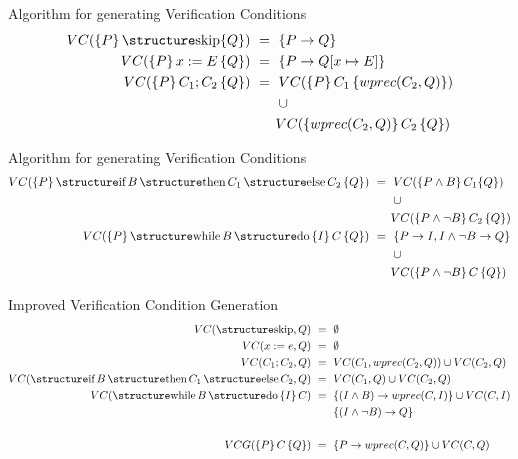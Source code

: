\documentclass[aspectratio=169]{beamer}
\begin{document}
\begin{slide}{Algorithm for generating Verification Conditions}
 \begin{align*}
 VC(\{P\}\,\kw{skip}\{Q\}) & ~=~ \{P \to Q\} \\
 VC(\{P\}\,x := E\,\{Q\})  & ~=~ \{P \to Q[x \mapsto E]\} \\
 VC(\{P\}\,C_1;C_2\,\{Q\}) & ~=~ VC(\{P\}\,C_1\,\{wprec(C_2,Q)\}) \\ &\:\:\:\:\:\:\:\:\:\cup \\& \:\:\:\:\:\:\:\:VC(\{wprec(C_2,Q)\}\,C_2\,\{Q\})  
 \end{align*}

\end{slide}

\begin{slide}{Algorithm for generating Verification Conditions}
 \begin{align*}
 VC(\{P\}\,\kw{if}\,B\,\kw{then}\,C_1\,\kw{else}\,C_2\,\{Q\}) & ~=~ VC(\{P \land B\}\,C_1\{Q\}) \\ &\:\:\:\:\:\:\:\:\:\cup \\& \:\:\:\:\:\:\:\:VC(\{P \land \neg B\}\,C_2\,\{Q\}) \\
 VC(\{P\}\,\kw{while}\,B\,\kw{do}\,\{I\}\,C\,\{Q\}) & ~=~ \{ P \to I , I \land \neg B \to Q\} \\ &\:\:\:\:\:\:\:\:\:\cup \\& \:\:\:\:\:\:\:\: VC(\{P \land \neg B\}\,C\,\{Q\}) 
 \end{align*}

\end{slide}

\begin{slide}{Improved Verification Condition Generation}
\begin{align*}
VC(\kw{skip},Q) & ~=~ \emptyset\\
VC(x := e,Q)    & ~=~ \emptyset\\
VC(C_1;C_2,Q)   & ~=~ VC(C_1,wprec(C_2,Q)) \cup VC(C_2,Q)\\
VC(\kw{if}\,B\,\kw{then}\,C_1\,\kw{else}\,C_2,Q) & ~=~ VC(C_1,Q) \cup VC(C_2,Q)\\
VC(\kw{while}\,B\,\kw{do}\,\{I\}\,C) & ~=~ \{ (I \land B) \to wprec(C,I) \} \cup VC(C,I)\\
& \:\:\:\:\:\:\:\:\:\{(I \land \neg B) \to Q\}\\
& \\
VCG(\{P\}\,C\,\{Q\}) & ~=~ \{P \to wprec(C,Q)\} \cup VC(C,Q)
\end{align*}
\end{slide}
\end{document}
